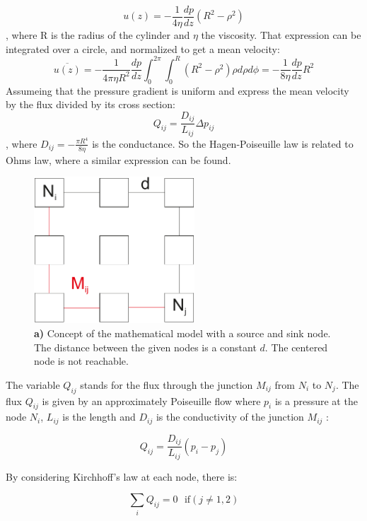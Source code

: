 \documentclass[11pt]{scrartcl}
\begin{document}
\begin{equation}
u(z)=-\frac{1}{4\eta}\frac{dp}{dz}(R^2-\rho^2)
\end{equation}
, where R is the radius of the cylinder and $\eta$ the viscosity. That expression can be integrated over a circle, and normalized to get a mean velocity:
\begin{equation}
\overline{u(z)}=-\frac{1}{4\pi\eta R^2}\frac{dp}{dz}\int_{0}^{2\pi}\int_{0}^{R}{(R^2-\rho^2)}\rho d\rho d\phi=-\frac{1}{8\eta}\frac{dp}{dz}R^2
\end{equation}
Assumeing that the pressure gradient is uniform and express the mean velocity by the flux divided by its cross section:
\begin{equation}
Q_{ij}=\frac{D_{ij}}{L_{ij}}\Delta p_{ij}
\end{equation}
, where $D_{ij}=-\frac{\pi R^4}{8\eta}$ is the conductance. So the Hagen-Poiseuille law is related to Ohms law, where a similar expression can be found.
\begin{figure}[H]
	\centering
	\includegraphics[width=6cm]{figures/figure1}
	\caption{\textbf{a)} Concept of the mathematical model with a source and sink node. The distance between the given nodes is a constant $d$. The centered node is not reachable.}
	\label{fig:schema}
\end{figure}

The variable $Q_{ij}$ stands for the flux through the junction $M_{ij}$ from $N_i$ to $N_j$. The flux $Q_{ij}$ is given by an approximately Poiseuille flow where $p_i$ is a pressure at the node $N_i$, $L_{ij}$ is the length and $D_{ij}$ is the conductivity of the junction $M_{ij}$ :

\begin{equation}
	\label{eq:1}
	Q_{ij}=\frac{D_{ij}}{L_{ij}}\left(p_i-p_j\right)
\end{equation}

By considering Kirchhoff's law at each node, there is:

\begin{equation}
	\label{eq:2}
	\sum_{i} Q_{ij}=0 \,\,\,\, \mathrm{if} \left(j\ne 1,2\right)
\end{equation}
\end{document}
